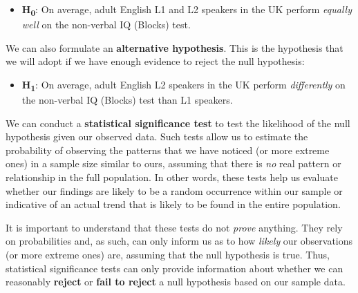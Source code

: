\documentclass[
  letterpaper,
  DIV=11,
  numbers=noendperiod]{scrreprt}
\providecommand{\tightlist}{%
  \setlength{\itemsep}{0pt}\setlength{\parskip}{0pt}}
\begin{document}
\begin{itemize}
\tightlist
\item
  \textbf{H\textsubscript{0}}: On average, adult English L1 and L2
  speakers in the UK perform \emph{equally well} on the non-verbal IQ
  (Blocks) test.
\end{itemize}

We can also formulate an \textbf{alternative hypothesis}. This is the
hypothesis that we will adopt if we have enough evidence to reject the
null hypothesis:

\begin{itemize}
\tightlist
\item
  \textbf{H\textsubscript{1}}: On average, adult English L2 speakers in
  the UK perform \emph{differently} on the non-verbal IQ (Blocks) test
  than L1 speakers.
\end{itemize}

We can conduct a \textbf{statistical significance test} to test the
likelihood of the null hypothesis given our observed data. Such tests
allow us to estimate the probability of observing the patterns that we
have noticed (or more extreme ones) in a sample size similar to ours,
assuming that there is \emph{no} real pattern or relationship in the
full population. In other words, these tests help us evaluate whether
our findings are likely to be a random occurrence within our sample or
indicative of an actual trend that is likely to be found in the entire
population.

It is important to understand that these tests do not \emph{prove}
anything. They rely on probabilities and, as such, can only inform us as
to how \emph{likely} our observations (or more extreme ones) are,
assuming that the null hypothesis is true. Thus, statistical
significance tests can only provide information about whether we can
reasonably \textbf{reject} or \textbf{fail to reject} a null hypothesis
based on our sample data.
\end{document}
